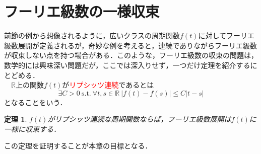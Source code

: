 \documentclass[a4j]{jsbook}
\newtheorem{theorem}{定理}
\numberwithin{theorem}{chapter}  %
\begin{document}
\section{フーリエ級数の一様収束} \label{sec1-5}
前節の例から想像されるように，広いクラスの周期関数\(f(t)\)に対してフーリエ級数展開が定義されるが，奇妙な例を考えると，連続でありながらフーリエ級数が収束しない点を持つ場合がある．このような，フーリエ級数の収束の問題は，数学的には興味深い問題だが，ここでは深入りせず，一つだけ定理を紹介するにとどめる．\\
　\(\mathbb{R}\)上の関数\(f(t)\)が\textcolor{red}{リプシッツ連続}であるとは
\begin{equation*}
    \exists C>0 \ \mathrm{s.t.} \ \forall t, s\in\mathbb{R} \ |f(t)-f(s)|\leq C|t-s|
\end{equation*}
となることをいう．
\begin{theorem}
\label{th1-3}
\(f(t)\)がリプシッツ連続な周期関数ならば，フーリエ級数展開は\(f(t)\)に一様に収束する．
\end{theorem}
この定理を証明することが本章の目標となる．
\end{document}
